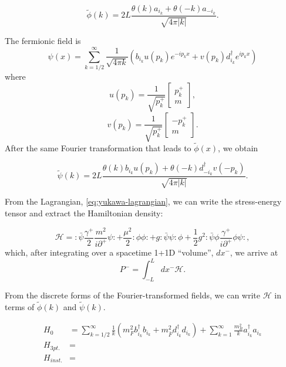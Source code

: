 \begin{equation}
    \tilde \phi(k) = 2L \frac{\theta(k)a_{i_k} + \theta(-k)a_{-i_k}}{\sqrt{4\pi |k|}}.
\end{equation}

The fermionic field is $$\psi(x) = \sum_{k = 1/2}^\infty \frac{1}{\sqrt{4\pi k}}\left(b_{i_k}u(p_k) e^{-ip_k x} + v(p_k)d_{i_k}^\dagger e^{ip_k x} \right)$$ where $$u(p_k) = \frac{1}{\sqrt{p_k^+}}\left[\begin{matrix} p^+_k \\ m \end{matrix}\right],$$ $$v(p_k) = \frac{1}{\sqrt{p_k^+}}\left[\begin{matrix} -p^+_k \\ m \end{matrix}\right].$$
After the same Fourier transformation that leads to $\tilde \phi(x)$, we obtain 

\begin{equation}
    \tilde \psi(k) = 2L \frac{\theta(k)b_{i_k}u(p_k) + \theta(-k)d^\dagger_{-i_k}v(-p_k)}{\sqrt{4\pi |k|}}.
\end{equation}

From the Lagrangian, \ref{eq:yukawa-lagrangian}, we can write the stress-energy tensor and extract the Hamiltonian density: 

\begin{equation}
    \mathcal{H} = : \bar\psi \frac{\gamma^+}{2}
    \frac{ m^2 }
    {i\partial^+}\psi :
  + \frac{\mu^2}{2} :\phi \phi:
  + g : \bar\psi\psi : \phi
  + \frac{1}{2} g^2
  :\bar\psi \phi
  \frac{\gamma^+}{i\partial^+} \phi \psi:,
\end{equation}
which, after integrating over a spacetime 1+1D ``volume'', $dx^-$, we arrive at $$P^- = \int_{-L}^L dx^- \mathcal{H}.$$

From the discrete forms of the Fourier-transformed fields, we can write $\mathcal{H}$ in terms of $\tilde \phi(k)$ and $\tilde \psi(k)$.

\begin{align}
    H_0 &= \sum_{k = 1/2}^\infty \frac{1}{k}\left(m_F^2 b_{i_k}^\dagger b_{i_k} + m_{\bar F}^2 d_{i_k}^\dagger d_{i_k} \right) + \sum_{k = 1}^\infty \frac{m_B^2}{k}a_{i_k}^\dagger a_{i_k}\\ \nonumber
    H_{3pt.} &= \\\nonumber
    H_{inst.} &= \\\nonumber
\end{align}

